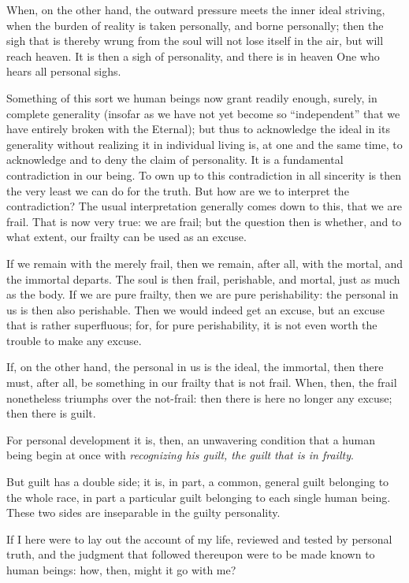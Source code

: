 \documentclass[12pt,a4paper]{book}
\begin{document}
When, on the other hand, the outward pressure meets the inner ideal striving, when the burden of reality is taken personally, and borne personally; then the sigh that is thereby wrung from the soul will not lose itself in the air, but will reach heaven. It is then a sigh of personality, and there is in heaven One who hears all personal sighs.

Something of this sort we human beings now grant readily enough, surely, in complete generality (insofar as we have not yet become so ``independent'' that we have entirely broken with the Eternal); but thus to acknowledge the ideal in its generality without realizing it in individual living is, at one and the same time, to acknowledge and to deny the claim of personality. It is a fundamental contradiction in our being. To own up to this contradiction in all sincerity is then the very least we can do for the truth. But how are we to interpret the contradiction?
The usual interpretation generally comes down to this, that we are frail. That is now very true: we are frail; but the question then is whether, and to what extent, our frailty can be used as an excuse.

If we remain with the merely frail, then we remain, after all, with the mortal, and the immortal departs. The soul is then frail, perishable, and mortal, just as much as the body. If we are pure frailty, then we are pure perishability: the personal in us is then also perishable. Then we would indeed get an excuse, but an excuse that is rather superfluous; for, for pure perishability, it is not even worth the trouble to make any excuse.

If, on the other hand, the personal in us is the ideal, the immortal, then there must, after all, be something in our frailty that is not frail. When, then, the frail nonetheless triumphs over the not-frail: then there is here no longer any excuse; then there is guilt.

For personal development it is, then, an unwavering condition that a human being begin at once with \emph{recognizing his guilt, the guilt that is in frailty}.

But guilt has a double side; it is, in part, a common, general guilt belonging to the whole race, in part a particular guilt belonging to each single human being. These two sides are inseparable in the guilty personality.

If I here were to lay out the account of my life, reviewed and tested by personal truth, and the judgment that followed thereupon were to be made known to human beings: how, then, might it go with me?
\end{document}

